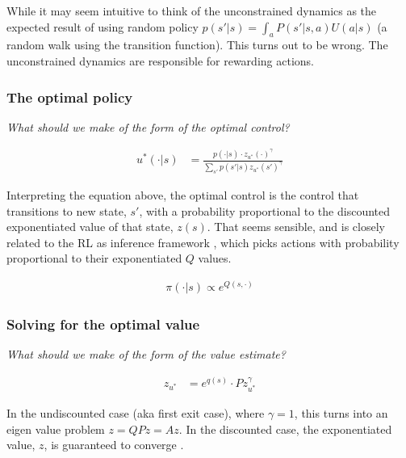 While it may seem intuitive to think of the unconstrained dynamics as the expected result of using random policy
$p(s' | s) = \int_a P(s' | s, a)U(a|s)$ (a random walk using the transition function).
This turns out to be wrong. The unconstrained dynamics are responsible for rewarding actions.

\subsubsection{The optimal policy}

\begin{displayquote}
\textsl{What should we make of the form of the optimal control?}
\end{displayquote}

\begin{align*}
u^{* }(\cdot | s) &= \frac{p(\cdot | s)\cdot z_{u^{* }}(\cdot)^{\gamma}}{\sum_{s'} p(s' | s) z_{u^{* }}(s')^{\gamma}}
\end{align*}

Interpreting the equation above, the optimal control is the control that transitions to new state, $s'$, with a
probability proportional to the discounted exponentiated value of that state, $z(s)$.
That seems sensible, and is closely related to the RL as inference framework \cite{Levinea},
which picks actions with probability proportional to their exponentiated $Q$ values.

\begin{align*}
\pi(\cdot|s) \propto e^{Q(s, \cdot)}
\end{align*}

\subsubsection{Solving for the optimal value}

\begin{displayquote}
\textsl{What should we make of the form of the value estimate?}
\end{displayquote}

\begin{align*}
z_{u^{* }} &= e^{q(s)}\cdot P z_{u^{* }}^{\gamma}
\end{align*}

In the undiscounted case (aka first exit case), where $\gamma=1$, this turns into an eigen value
problem $z = QPz = Az$. In the discounted case, the exponentiated value, $z$, is guaranteed to converge \cite{Todorov2009}.

